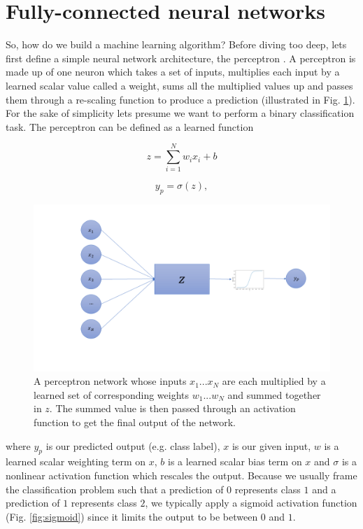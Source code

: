 \section{Fully-connected neural networks}

%
%
So, how do we build a machine learning algorithm? Before diving too deep, lets first define a simple neural network architecture, the perceptron \cite{minsky69perceptrons}. A perceptron is made up of one neuron which takes a set of inputs, multiplies each input by a learned scalar value called a weight, sums all the multiplied values up and passes them through a re-scaling function to produce a prediction (illustrated in Fig. \ref{fig:Perceptron_network}). For the sake of simplicity lets presume we want to perform a binary classification task. The perceptron can be defined as a learned function

\begin{equation}
    z = \sum_{i=1}^{N} w_{i} x_{i} + b
\end{equation}{}

\begin{equation}
    y_{p} = \sigma(z),
\end{equation}{}

\begin{figure}
    \centering
    \includegraphics[width=\linewidth]{figures/Perceptron_network.png}
    \caption{A perceptron network whose inputs $x_1 ... x_N$ are each multiplied 
    by a learned set of corresponding weights $w_1 ... w_N$ and summed together in $z$. 
    The summed value is then passed through an activation function to get the final 
    output of the network.}
    \label{fig:Perceptron_network}
\end{figure}

where $y_{p}$ is our predicted output (e.g. class label), $x$ is our given input, $w$ is a learned scalar weighting term on $x$, $b$ is a learned scalar bias term on $x$ and $\sigma$ is a nonlinear activation function which rescales the output. Because we usually frame the classification problem such that a prediction of $0$ represents class $1$ and a prediction of $1$ represents class $2$, we typically apply a sigmoid activation function (Fig. \ref{fig:sigmoid}) since it limits the output to be between $0$ and $1$.

